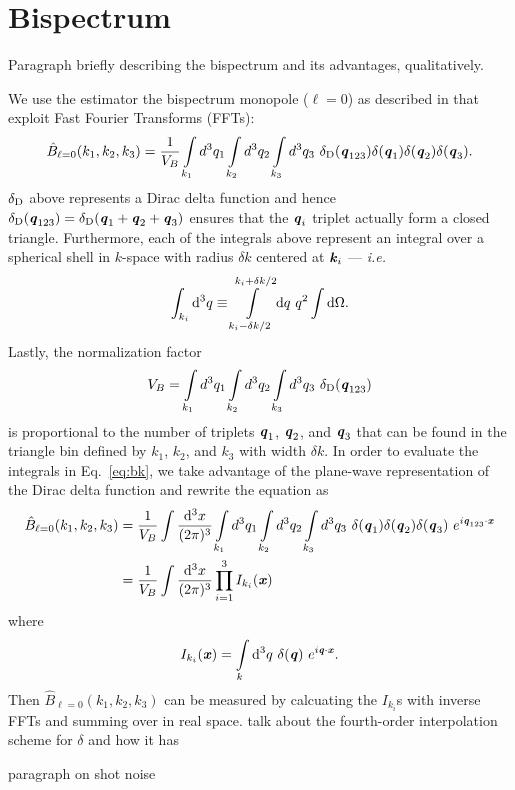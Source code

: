 \documentclass[12pt, letterpaper, preprint]{aastex62}
\newcommand{\bfi}[1]{\textbf{\textit{#1}}}
\newcommand{\beq}{\begin{equation}}
\newcommand{\eeq}{\end{equation}}
\newcommand{\ch}[1]{{\color{orange}{\bf CH:} #1}}
\begin{document}
\section{Bispectrum} \label{sec:bk} 
Paragraph briefly describing the bispectrum and its advantages, qualitatively.

We use the estimator the bispectrum monopole ($\ell = 0$) as described in 
\cite{scoccimarro2015,sefusatti2016} that exploit Fast Fourier Transforms 
(FFTs): 
\beq \label{eq:bk} 
\hat{B}_{\ell = 0}(k_1,k_2, k_3) = \frac{1}{V_B}\int\limits_{k_1}d^3q_1 \int\limits_{k_2}d^3q_2 \int\limits_{k_3}d^3q_3~\delta_{\rm D}({\bfi q_{123}}) \delta({\bfi q_1}) \delta({\bfi q_2}) \delta({\bfi q_3}).
\eeq
$\delta_{\rm D}$ above represents a Dirac delta function and hence
$\delta_{\rm D}({\bfi q_{123}}) = \delta_{\rm D}({\bfi q_1} + {\bfi q_2} + {\bfi q_3})$ 
ensures that the ${\bfi q}_i$ triplet actually form a closed triangle. Furthermore, 
each of the integrals above represent an integral over a spherical shell in $k$-space 
with radius $\delta k$ centered at ${\bfi k}_i$ --- \emph{i.e.} 
\beq
\int_{k_i}{\rm d}^3q \equiv \int\limits_{k_i-\delta k/2}^{k_i+\delta k/2}{\rm d}q~q^2\int {\rm d}\Omega.
\eeq
Lastly, the normalization factor
\beq
V_B = \int\limits_{k_1}d^3q_1 \int\limits_{k_2}d^3q_2 \int\limits_{k_3}d^3q_3~\delta_{\rm D}({\bfi q_{123}})
\eeq
is proportional to the number of triplets ${\bfi q_1}$, ${\bfi q_2}$, and ${\bfi q_3}$
that can be found in the triangle bin defined by $k_1$, $k_2$, and $k_3$ with 
width $\delta k$. In order to evaluate the integrals in Eq.~\ref{eq:bk}, we 
take advantage of the plane-wave representation of the Dirac delta function 
and rewrite the equation as
\begin{align}
\hat{B}_{\ell = 0}(k_1,k_2, k_3) &= \frac{1}{V_B} \int\frac{{\rm d}^3x}{(2\pi)^3}\int\limits_{k_1}d^3q_1 \int\limits_{k_2}d^3q_2 \int\limits_{k_3}d^3q_3~\delta({\bfi q_1}) \delta({\bfi q_2}) \delta({\bfi q_3})~e^{i{\bfi q_{123}}\cdot{\bfi x}} \\ 
    &= \frac{1}{V_B} \int\frac{{\rm d}^3x}{(2\pi)^3}\prod\limits_{i=1}^{3} I_{k_i}({\bfi x})
\end{align}
where 
\beq
I_{k_i}({\bfi x}) = \int\limits_k {\rm d}^3q~\delta({\bfi q})~e^{i {\bfi q}\cdot{\bfi x}}. 
\eeq
Then $\hat{B}_{\ell = 0}(k_1,k_2, k_3)$ can be measured by calcuating the $I_{k_i}$s 
with inverse FFTs and summing over in real space. 
\ch{talk about the fourth-order interpolation scheme for $\delta$ and how it has} 

\ch{paragraph on shot noise} 
\end{document}
